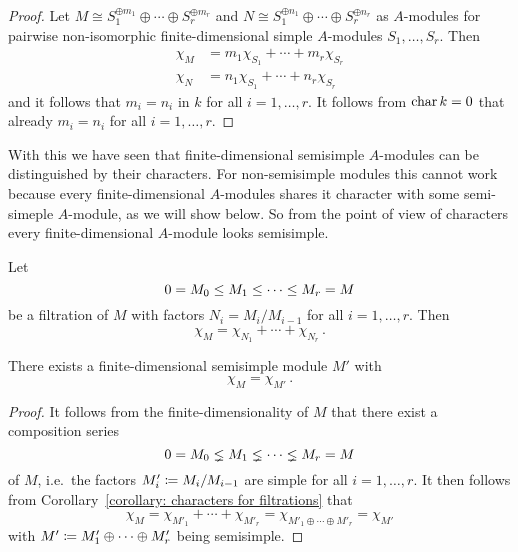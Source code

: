 \begin{proof}
  Let $M \cong S_1^{\oplus m_1} \oplus \dotsb \oplus S_r^{\oplus m_r}$ and $N \cong S_1^{\oplus n_1} \oplus \dotsb \oplus S_r^{\oplus n_r}$ as $A$-modules for pairwise non-isomorphic finite-dimensional simple $A$-modules $S_1, \dotsc, S_r$.
  Then
  \begin{align*}
    \chi_M &= m_1 \chi_{S_1} + \dotsb + m_r \chi_{S_r}  \\
    \chi_N &= n_1 \chi_{S_1} + \dotsb + n_r \chi_{S_r}
  \end{align*}
  and it follows that $m_i = n_i$ in $k$ for all $i = 1, \dotsc, r$.
  It follows from $\operatorname{char} k = 0$ that already $m_i = n_i$ for all $i = 1, \dotsc, r$.
\end{proof}


\begin{fluff}
  With this we have seen that finite-dimensional semisimple $A$-modules can be distinguished by their characters.
  For non-semisimple modules this cannot work because every finite-dimensional $A$-modules shares it character with some semi-simeple $A$-module, as we will show below.
  So from the point of view of characters every finite-dimensional $A$-module looks semisimple.
\end{fluff}


\begin{corollary}
  \label{corollary: characters for filtrations}
  Let
  \[
                0
    =           M_0
    \leq  M_1
    \leq  \dotsb
    \leq  M_r
    =           M
  \]
  be a filtration of $M$ with factors $N_i = M_i/M_{i-1}$ for all $i = 1, \dotsc, r$.
  Then
  \[
      \chi_M
    = \chi_{N_1} + \dotsb + \chi_{N_r} \,.
  \]
\end{corollary}


\begin{corollary}
  There exists a finite-dimensional semisimple module $M'$ with
  \[
    \chi_M = \chi_{M'} \,.
  \]
\end{corollary}


\begin{proof}
  It follows from the finite-dimensionality of $M$ that there exist a composition series
  \[
                  0
    =             M_0
    \lneq   M_1
    \lneq   \dotsb
    \lneq   M_r
    =             M
  \]
  of $M$, i.e.\ the factors $M'_i \coloneqq M_i/M_{i-1}$ are simple for all $i = 1, \dotsc, r$.
  It then follows from Corollary~\ref{corollary: characters for filtrations} that
  \[
      \chi_M
    = \chi_{M'_1} + \dotsb + \chi_{M'_r}
    = \chi_{M'_1 \oplus \dotsb \oplus M'_r}
    = \chi_{M'}
  \]
  with $M' \coloneqq M'_1 \oplus \dotsb \oplus M'_r$ being semisimple.
\end{proof}





